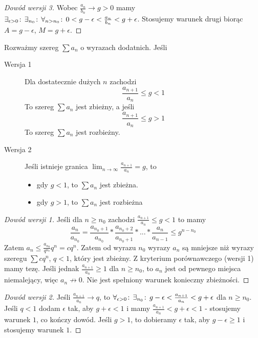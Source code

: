 \documentclass[9pt]{article}
\begin{document}
\begin{proof}[Dowód wersji 3]
    Wobec $\frac{a_n}{b_n} \to g > 0$ mamy 
    $\exists_{\epsilon > 0} \! : \, \exists_{n_0} \! : \, \forall_{n > n_0} \! : \, 0 < g-\epsilon < \frac{a_n}{b_n} < g+\epsilon$.
    Stosujemy warunek drugi biorąc $A = g-\epsilon$, $M = g + \epsilon$.
\end{proof}

\begin{Twi}
    Rozważmy szereg $\sum a_n$ o wyrazach dodatnich. Jeśli
    \begin{description}
        \item[Wersja 1] Dla dostatecznie dużych $n$ zachodzi
            \[
                \frac{a_{n+1}}{a_n} \le g < 1
            \]
            To szereg $\sum a_n$ jest zbieżny, a jeśli
            \[
                \frac{a_{n+1}}{a_n} \le g > 1
            \]
            To szereg $\sum a_n$ jest rozbieżny.
        \item[Wersja 2]
            Jeśli istnieje granica $\lim_{n \to \infty} \frac{a_{n+1}}{a_n} = g$, to
            \begin{itemize}
                \item gdy $g < 1$, to $\sum a_n$ jest zbieżna.
                \item gdy $g > 1$, to $\sum a_n$ jest rozbieżna
            \end{itemize}
    \end{description}
\end{Twi}

\begin{proof}[Dowód wersji 1]
    Jeśli dla $n \ge n_0$ zachodzi $\frac{a_{n+1}}{a_n} \le g < 1$ to mamy
    \[
        \frac{a_n}{a_{n_0}} = \frac{a_{n_0+1}}{a_{n_0}}*\frac{a_{n_0+2}}{a_{n_0+1}}
        *...* \frac{a_n}{a_{n-1}} \le g^{n-n_0}
    \]
    Zatem $a_n \le \frac{a_{n_0}}{q^{n_0}} q^n = c q^n$.
    Zatem od wyrazu $n_0$ wyrazy $a_n$ są mniejsze niż wyrazy szeregu $\sum cq^n$,
    $q < 1$, który jest zbieżny. Z kryterium porównawczego (wersji 1) mamy tezę. Jeśli jednak
    $\frac{a_{n+1}}{a_n} \ge 1$ dla $n \ge n_0$, to $a_n$ jest od pewnego miejsca niemalejący, więc
    $a_n \not\to 0$. Nie jest spełniony warunek konieczny zbieżności.
\end{proof}

\begin{proof}[Dowód wersji 2]
    Jeśli $\frac{a_{n+1}}{a_n} \to q$, to
    $\forall_{\epsilon > 0} \! : \, \exists_{n_0} \! : \, g-\epsilon < \frac{a_{n+1}}{a_n} < g+\epsilon$ dla $n \ge n_0$.
    Jeśli $q < 1$ dodam $\epsilon$ tak, aby $g + \epsilon < 1$ i mamy
    $\frac{a_{n+1}}{a_n} < g+\epsilon < 1$ - stosujemy warunek $1$, co kończy dowód. Jeśli $g > 1$,
    to dobieramy $\epsilon$ tak, aby $g-\epsilon \ge 1$ i stosujemy warunek $1$.
\end{proof}
\end{document}
